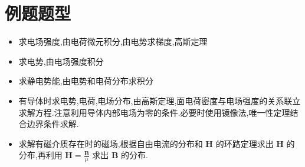     \section{例题题型}
    \begin{itemize}
        \item 求电场强度,由电荷微元积分,由电势求梯度,高斯定理
        \item 求电势,由电场强度积分
        \item 求静电势能,由电势和电荷分布求积分
        \item 有导体时求电势,电荷,电场分布,由高斯定理,面电荷密度与电场强度的关系联立求解方程.注意利用导体内部电场为零的条件.必要时使用镜像法,唯一性定理结合边界条件求解.
        \item 求解有磁介质存在时的磁场,根据自由电流的分布和 $\bm{H}$ 的环路定理求出 $\bm{H}$ 的分布,再利用 $\bm{H}=\frac{\bm{B}}{\mu}$ 求出 $\bm{B}$ 的分布.
    \end{itemize}


